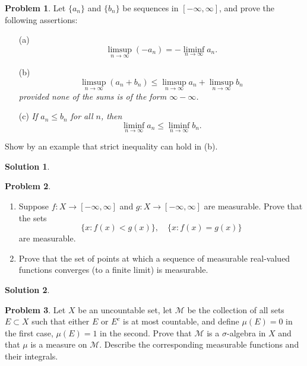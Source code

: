 \documentclass[12pt]{article}
\theoremstyle{definition} %
\newtheorem{solution}{Solution}
\newtheorem{problem}{Problem}
\theoremstyle{plain} %
\begin{document}
\begin{problem}
  Let $\{a_n\}$ and $\{b_n\}$ be sequences in $[-\infty, \infty]$, and prove the following assertions:
  
  \begin{enumerate}
      \item[(a)] 
      \[
          \limsup_{n \to \infty} (-a_n) = -\liminf_{n \to \infty} a_n.
      \]
  
      \item[(b)] 
      \[
          \limsup_{n \to \infty} (a_n + b_n) \le \limsup_{n \to \infty} a_n + \limsup_{n \to \infty} b_n
      \]
      \textit{provided none of the sums is of the form $\infty - \infty$.}
  
      \item[(c)] \textit{If $a_n \le b_n$ for all $n$, then}
      \[
          \liminf_{n \to \infty} a_n \le \liminf_{n \to \infty} b_n.
      \]
  \end{enumerate}
  
  Show by an example that strict inequality can hold in (b).
  \end{problem}
\begin{solution}
  
\end{solution}
\begin{problem}
 \noindent
 \begin{enumerate}
  \item Suppose $f \colon X \to [-\infty, \infty]$ and $g \colon X \to [-\infty, \infty]$ are measurable. Prove that the sets
  \[
  \{x : f(x) < g(x)\}, \quad \{x : f(x) = g(x)\}
  \]
  are measurable.
  \item Prove that the set of points at which a sequence of measurable real-valued functions converges (to a finite limit) is measurable.
 \end{enumerate}
  
  \end{problem}
\begin{solution}
  
\end{solution}
\begin{problem}
  Let $X$ be an uncountable set, let $\mathcal{M}$ be the collection of all sets $E \subset X$ such that either $E$ or $E^c$ is at most countable, and define $\mu(E) = 0$ in the first case, $\mu(E) = 1$ in the second. Prove that $\mathcal{M}$ is a $\sigma$-algebra in $X$ and that $\mu$ is a measure on $\mathcal{M}$. Describe the corresponding measurable functions and their integrals.
  \end{problem}
\end{document}
